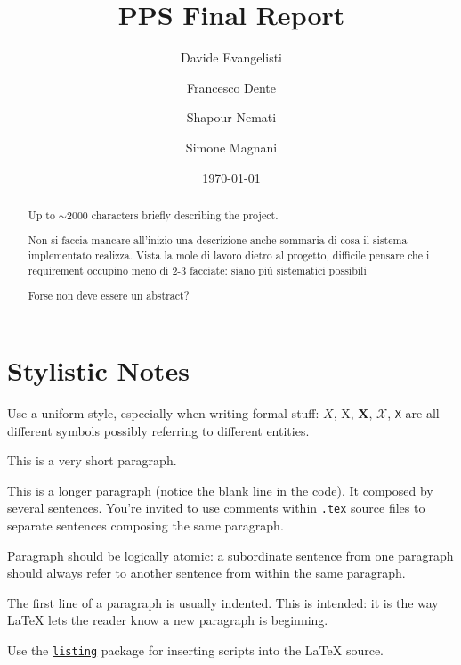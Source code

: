 \documentclass{scrartcl}
\title{\LARGE
    PPS Final Report
}
\author{
    Davide Evangelisti \\ \emailaddr{davide.evangelisti2@studio.unibo.it}
    \and 
    Francesco Dente \\ \emailaddr{francesco.dente@studio.unibo.it} 
    \and 
    Shapour Nemati \\ \emailaddr{shapour.nemati@studio.unibo.it}
    \and 
    Simone Magnani \\ \emailaddr{simone.magnani4@studio.unibo.it} 
    
}
\date{\today}
\begin{document}
\maketitle

\begin{abstract}
    Up to $\sim$2000 characters briefly describing the project.
    
    Non si faccia mancare all'inizio una descrizione anche sommaria di cosa il sistema implementato realizza.
Vista la mole di lavoro dietro al progetto, difficile pensare che i requirement occupino meno di 2-3 facciate: siano più sistematici possibili


Forse non deve essere un abstract?
\end{abstract}













\section*{Stylistic Notes}

Use a uniform style, especially when writing formal stuff: $X$, X, $\mathbf{X}$, $\mathcal{X}$, \texttt{X} are all different symbols possibly referring to different entities. 

This is a very short paragraph.

This is a longer paragraph (notice the blank line in the code).
It composed by several sentences.
%
You're invited to use comments within \texttt{.tex} source files to separate sentences composing the same paragraph.

Paragraph should be logically atomic: a subordinate sentence from one paragraph should always refer to another sentence from within the same paragraph.

The first line of a paragraph is usually indented.
%
This is intended: it is the way \LaTeX{} lets the reader know a new paragraph is beginning.

Use the \href{https://en.wikibooks.org/wiki/LaTeX/Source_Code_Listings}{\texttt{listing}} package for inserting scripts into the \LaTeX{} source.

\nocite{*} %


\end{document}
